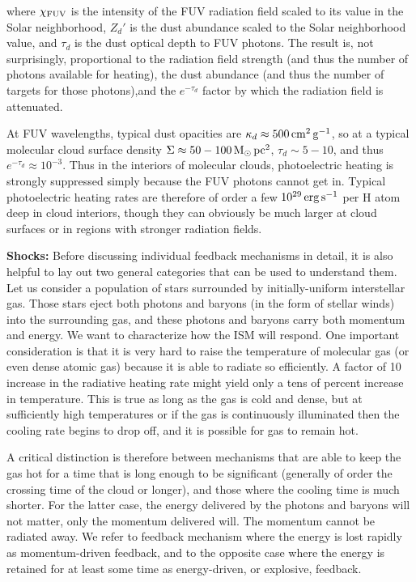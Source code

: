 \documentclass[a4paper,10pt]{article}
\begin{document}
{\noindent}where $\chi_{\rm FUV}$ is the intensity of the FUV radiation field scaled to its value in the Solar neighborhood, $Z_d'$ is the dust abundance scaled to the Solar neighborhood value, and $\tau_d$ is the dust optical depth to FUV photons. The result is, not surprisingly, proportional to the radiation field strength (and thus the number of photons available for heating), the dust abundance (and thus the number of targets for those photons),and the $e^{-\tau_d}$ factor by which the radiation field is attenuated.

{\noindent}At FUV wavelengths, typical dust opacities are $\kappa_d\approx500\,{\rm cm^2\,g^{-1}}$, so at a typical molecular cloud surface density $\Sigma\approx50-100\,{\rm M_\odot\,pc^2}$, $\tau_d\sim5-10$, and thus $e^{-\tau_d}\approx10^{-3}$. Thus in the interiors of molecular clouds, photoelectric heating is strongly suppressed simply because the FUV photons cannot get in. Typical photoelectric heating rates are therefore of order a few $10^{29}\,{\rm erg\,s^{-1}}$ per H atom deep in cloud interiors, though they can obviously be much larger at cloud surfaces or in regions with stronger radiation fields.

{\noindent}\textbf{Shocks:} Before discussing individual feedback mechanisms in detail, it is also helpful to lay out two general categories that can be used to understand them. Let us consider a population of stars surrounded by initially-uniform interstellar gas. Those stars eject both photons and baryons (in the form of stellar winds) into the surrounding gas, and these photons and baryons carry both momentum and energy. We want to characterize how the ISM will respond. One important consideration is that it is very hard to raise the temperature of molecular gas (or even dense atomic gas) because it is able to radiate so efficiently. A factor of 10 increase in the radiative heating rate might yield only a tens of percent increase in temperature. This is true as long as the gas is cold and dense, but at sufficiently high temperatures or if the gas is continuously illuminated then the cooling rate begins to drop off, and it is possible for gas to remain hot.

{\noindent}A critical distinction is therefore between mechanisms that are able to keep the gas hot for a time that is long enough to be significant (generally of order the crossing time of the cloud or longer), and those where the cooling time is much shorter. For the latter case, the energy delivered by the photons and baryons will not matter, only the momentum delivered will. The momentum cannot be radiated away. We refer to feedback mechanism where the energy is lost rapidly as momentum-driven feedback, and to the opposite case where the energy is retained for at least some time as energy-driven, or explosive, feedback. 
\end{document}
